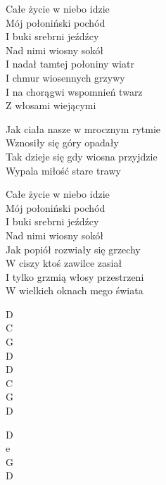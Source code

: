 \begin{text}
    Całe życie w niebo idzie\\
    Mój połoniński pochód\\
    I buki srebrni jeźdźcy\\
    Nad nimi wiosny sokół\\
    I nadał tamtej połoniny wiatr\\
    I chmur wiosennych grzywy\\
    I na chorągwi wspomnień twarz\\
    Z włosami wiejącymi

    \vin Jak ciała nasze w mrocznym rytmie\\
    \vin Wznosiły się góry opadały\\
    \vin Tak dzieje się gdy wiosna przyjdzie\\
    \vin Wypala miłość stare trawy

    Całe życie w niebo idzie\\
    Mój połoniński pochód\\
    I buki srebrni jeźdźcy\\
    Nad nimi wiosny sokół\\
    Jak popiół rozwiały się grzechy\\
    W ciszy ktoś zawilce zasiał\\
    I tylko grzmią włosy przestrzeni\\
    W wielkich oknach mego świata
\end{text}
\begin{chord}
    D\\
    C\\
    G\\
    D\\
    D\\
    C\\
    G\\
    D

    D\\
    e\\
    G\\
    D
\end{chord}
